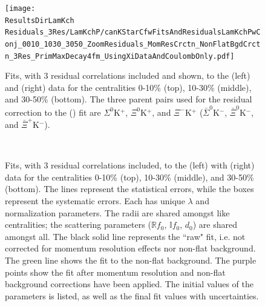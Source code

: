 \documentclass[../AnalysisNoteJBuxton.tex]{subfiles}
\begin{document}
\begin{figure}[h]
  \centering
  \texttt{[image: \\ResultsDirLamKch Residuals\_3Res/LamKchP/canKStarCfwFitsAndResidualsLamKchPwConj\_0010\_1030\_3050\_ZoomResiduals\_MomResCrctn\_NonFlatBgdCrctn\_3Res\_PrimMaxDecay4fm\_UsingXiDataAndCoulombOnly.pdf]}
  \caption[\LamKchPALamKchM Fits showing 3 Residuals]{Fits, with 3 residual correlations included and shown, to the \LamKchP (left) and \ALamKchM (right) data for the centralities 0-10\% (top), 10-30\% (middle), and 30-50\% (bottom).  The three parent pairs used for the residual correction to the \LamKchP (\ALamKchM) fit are $\Sigma^{0}$K$^{+}$, $\Xi^{0}$K$^{+}$, and $\Xi^{-}$K$^{+}$ ($\bar{\Sigma}^{0}$K$^{-}$, $\bar{\Xi}^{0}$K$^{-}$, and $\bar{\Xi}^{+}$K$^{-}$).}
  \label{fig:LamKchPwConjFitsAndResiduals_3Res}
\end{figure}






\begin{figure}[h!]
  \centering
  \\  
  \caption[\LamKchMALamKchP Fits with 3 Residuals]{Fits, with 3 residual correlations included, to the \LamKchM(left) with \ALamKchP (right) data for the centralities 0-10\% (top), 10-30\% (middle), and 30-50\% (bottom).
The lines represent the statistical errors, while the boxes represent the systematic errors.  
Each has unique $\lambda$ and normalization parameters.
The radii are shared amongst like centralities; the scattering parameters ($\mathbb{R}f_{0}$, $\mathbb{I}f_{0}$, $d_{0}$) are shared amongst all.
The black solid line represents the ``raw" fit, i.e. not corrected for momentum resolution effects nor non-flat background.  
The green line shows the fit to the non-flat background.
The purple points show the fit after momentum resolution and non-flat background corrections have been applied.
The initial values of the parameters is listed, as well as the final fit values with uncertainties.}
  \label{fig:LamKchMwConjFits_3Res}
\end{figure}
\end{document}
